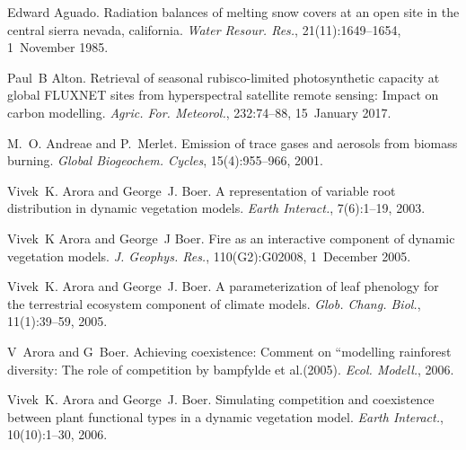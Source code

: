 
\begin{DoxyDescription}
\item[\label{_CITEREF_Aguado1985-fv}%
\mbox{[}1\mbox{]}]Edward Aguado. Radiation balances of melting snow covers at an open site in the central sierra nevada, california. {\itshape Water Resour. Res.}, 21(11)\+:1649--1654, 1~November 1985. 


\item[\label{_CITEREF_Alton2017-pd}%
\mbox{[}2\mbox{]}]Paul~B Alton. Retrieval of seasonal rubisco-\/limited photosynthetic capacity at global F\+L\+U\+X\+N\+E\+T sites from hyperspectral satellite remote sensing\+: Impact on carbon modelling. {\itshape Agric. For. Meteorol.}, 232\+:74--88, 15~January 2017. 


\item[\label{_CITEREF_Andreae2001-e04}%
\mbox{[}3\mbox{]}]M.~O. Andreae and P.~Merlet. Emission of trace gases and aerosols from biomass burning. {\itshape Global Biogeochem. Cycles}, 15(4)\+:955--966, 2001. 


\item[\label{_CITEREF_Arora2003838}%
\mbox{[}4\mbox{]}]Vivek~K. Arora and George~J. Boer. A representation of variable root distribution in dynamic vegetation models. {\itshape Earth Interact.}, 7(6)\+:1--19, 2003. 


\item[\label{_CITEREF_Arora20052ac}%
\mbox{[}5\mbox{]}]Vivek~K Arora and George~J Boer. Fire as an interactive component of dynamic vegetation models. {\itshape J. Geophys. Res.}, 110(G2)\+:G02008, 1~December 2005. 


\item[\label{_CITEREF_Arora2005-6b1}%
\mbox{[}6\mbox{]}]Vivek~K. Arora and George~J. Boer. A parameterization of leaf phenology for the terrestrial ecosystem component of climate models. {\itshape Glob. Chang. Biol.}, 11(1)\+:39--59, 2005. 


\item[\label{_CITEREF_Arora2006-pp}%
\mbox{[}7\mbox{]}]V~Arora and G~Boer. Achieving coexistence\+: Comment on ``modelling rainforest diversity\+: The role of competition\textquotesingle{}\textquotesingle{} by bampfylde et al.(2005). {\itshape Ecol. Modell.}, 2006.


\item[\label{_CITEREF_Arora2006-ax}%
\mbox{[}8\mbox{]}]Vivek~K. Arora and George~J. Boer. Simulating competition and coexistence between plant functional types in a dynamic vegetation model. {\itshape Earth Interact.}, 10(10)\+:1--30, 2006. 



\end{DoxyDescription}

